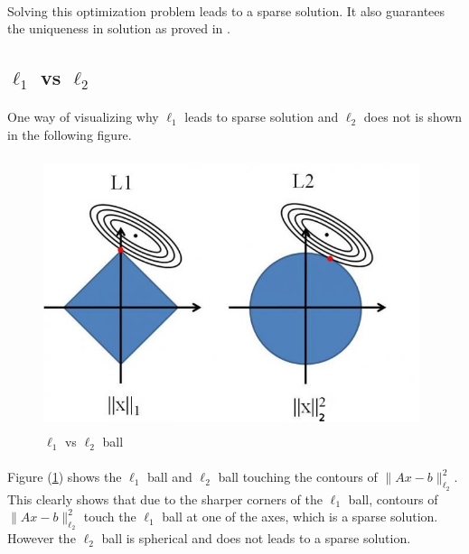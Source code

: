 \paragraph{}Solving this optimization problem leads to a sparse solution. It also guarantees the uniqueness in
solution as proved in .

\subsection{$\ell_1$ vs $\ell_2$}
\label{s:l1_vs_l2}

\paragraph{}One way of visualizing why $\ell_1$ leads to sparse solution and $\ell_2$ does not is shown in the 
following figure.

\begin{figure}[!htbp]
  \begin{center}
      \includegraphics[height = 8cm, width=11cm]{figures/final_l1vsl2}
    \caption{$\ell_1$ vs $\ell_2$ ball}
    \label{Figl1vsl2}
  \end{center}
\end{figure}

\paragraph{}Figure (\ref{Figl1vsl2}) shows the $\ell_1$ ball and $\ell_2$ ball touching the contours of 
$\parallel Ax - b \parallel_{\ell_2}^2$. This clearly shows that due to the sharper corners of the $\ell_1$ ball,
contours of $\parallel Ax - b \parallel_{\ell_2}^2$ touch the $\ell_1$ ball at one of the axes, which is a sparse 
solution. However the $\ell_2$ ball is spherical and does not leads to a sparse solution.

